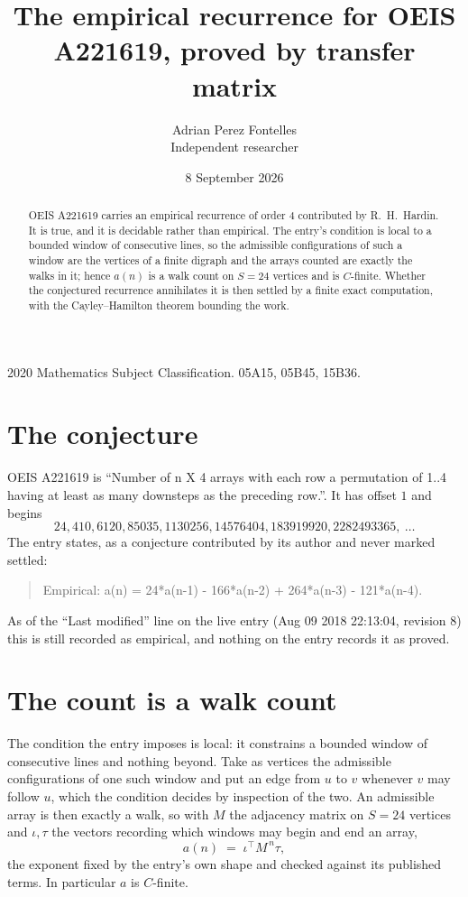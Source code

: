 \documentclass[11pt,a4paper]{article}
\title{The empirical recurrence for OEIS A221619, proved by transfer matrix}
\author{Adrian Perez Fontelles\\ \small Independent researcher}
\date{8 September 2026}
\theoremstyle{plain}
\theoremstyle{definition}
\begin{document}
\maketitle

\begin{abstract}
OEIS A221619 carries an empirical recurrence of order $4$ contributed by R.~H.~Hardin. It is
true, and it is decidable rather than empirical. The entry's condition is local to a bounded window of consecutive lines, so
the admissible configurations of such a window are the vertices of a finite digraph and the
arrays counted are exactly the walks in it; hence $a(n)$ is a walk count on $S=24$ vertices
and is $C$-finite. Whether the conjectured recurrence annihilates it is then settled by a
finite exact computation, with the Cayley--Hamilton theorem bounding the work.
\end{abstract}

\noindent\small 2020 Mathematics Subject Classification. 05A15, 05B45, 15B36.\normalsize

\section{The conjecture}

OEIS A221619 is ``Number of n X 4 arrays with each row a permutation of 1..4 having at least as many downsteps as the preceding row.''. It has offset $1$ and begins
\[
24, 410, 6120, 85035, 1130256, 14576404, 183919920, 2282493365,\ \dots
\]
The entry states, as a conjecture contributed by its author and never marked settled:
\begin{quote}
Empirical: a(n) = 24*a(n-1) - 166*a(n-2) + 264*a(n-3) - 121*a(n-4).
\end{quote}
As of the ``Last modified'' line on the live entry (Aug 09 2018 22:13:04, revision 8) this is still
recorded as empirical, and nothing on the entry records it as proved.

\section{The count is a walk count}

The condition the entry imposes is local: it constrains a bounded window of consecutive lines and nothing beyond. Take as
vertices the admissible configurations of one such window and put an edge from $u$ to $v$
whenever $v$ may follow $u$, which the condition decides by inspection of the two. An
admissible array is then exactly a walk, so with $M$ the adjacency matrix on $S=24$ vertices
and $\iota,\tau$ the vectors recording which windows may begin and end an array,
\[
a(n)\;=\;\iota^{\!\top}M^{\,n}\tau ,
\]
the exponent fixed by the entry's own shape and checked against its published terms. In
particular $a$ is $C$-finite.
\end{document}
